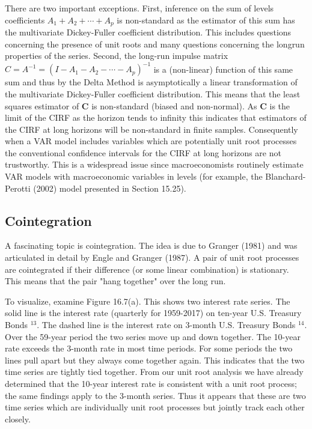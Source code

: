 \documentclass[10pt]{article}
\begin{document}
There are two important exceptions. First, inference on the sum of levels coefficients $A_{1}+A_{2}+\cdots+A_{p}$ is non-standard as the estimator of this sum has the multivariate Dickey-Fuller coefficient distribution. This includes questions concerning the presence of unit roots and many questions concerning the longrun properties of the series. Second, the long-run impulse matrix $C=A^{-1}=\left(I-A_{1}-A_{2}-\cdots-A_{p}\right)^{-1}$ is a (non-linear) function of this same sum and thus by the Delta Method is asymptotically a linear transformation of the multivariate Dickey-Fuller coefficient distribution. This means that the least squares estimator of $\boldsymbol{C}$ is non-standard (biased and non-normal). As $\boldsymbol{C}$ is the limit of the CIRF as the horizon tends to infinity this indicates that estimators of the CIRF at long horizons will be non-standard in finite samples. Consequently when a VAR model includes variables which are potentially unit root processes the conventional confidence intervals for the CIRF at long horizons are not trustworthy. This is a widespread issue since macroeconomists routinely estimate VAR models with macroeconomic variables in levels (for example, the Blanchard-Perotti (2002) model presented in Section 15.25).

\subsection{Cointegration}
A fascinating topic is cointegration. The idea is due to Granger (1981) and was articulated in detail by Engle and Granger (1987). A pair of unit root processes are cointegrated if their difference (or some linear combination) is stationary. This means that the pair "hang together" over the long run.

To visualize, examine Figure 16.7(a). This shows two interest rate series. The solid line is the interest rate (quarterly for 1959-2017) on ten-year U.S. Treasury Bonds ${ }^{13}$. The dashed line is the interest rate on 3-month U.S. Treasury Bonds ${ }^{14}$. Over the 59-year period the two series move up and down together. The 10-year rate exceeds the 3-month rate in most time periods. For some periods the two lines pull apart but they always come together again. This indicates that the two time series are tightly tied together. From our unit root analysis we have already determined that the 10-year interest rate is consistent with a unit root process; the same findings apply to the 3-month series. Thus it appears that these are two time series which are individually unit root processes but jointly track each other closely.
\end{document}
